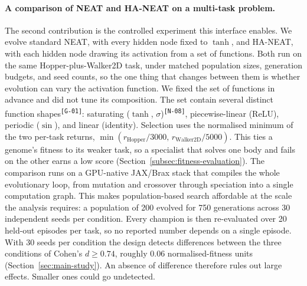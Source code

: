 \documentclass[12pt]{article}
\newcommand{\revID}[1]{\textsuperscript{\scriptsize\texttt{[#1]}}}
\newcommand{\revGram}[2]{\textcolor{lrRed}{#2}\revID{#1}}       %
\newcommand{\revNota}[2]{\textcolor{lrViolet}{#2}\revID{#1}}    %
\begin{document}
\paragraph{A comparison of NEAT and HA-NEAT on a multi-task problem.}
The second contribution is the controlled experiment this interface enables.
We evolve standard NEAT, with every hidden node fixed to $\tanh$, and HA-NEAT, with each hidden node drawing its activation from a set of functions.
Both run on the same Hopper-plus-Walker2D task, under matched population sizes, generation budgets, and seed counts, so the one thing that changes between them is whether evolution can vary the activation function.
We fixed the set of functions in advance and did not tune its composition.
\revGram{G-01}{The set contain several distinct function shapes}: \revNota{N-08}{saturating ($\tanh$, $\sigma$)}, piecewise-linear (ReLU), periodic ($\sin$), and linear (identity).
Selection uses the normalised minimum of the two per-task returns, $\min(r_{\text{Hopper}}/3000,\, r_{\text{Walker2D}}/5000)$.
This ties a genome's fitness to its weaker task, so a specialist that solves one body and fails on the other earns a low score (Section~\ref{subsec:fitness-evaluation}).
The comparison runs on a GPU-native JAX/Brax stack \parencite{freeman_brax_2021,wang_tensorized_2024} that compiles the whole evolutionary loop, from mutation and crossover through speciation into a single computation graph.
This makes population-based search affordable at the scale the analysis requires: a population of 200 evolved for 750 generations across 30 independent seeds per condition.
Every champion is then re-evaluated over 20 held-out episodes per task, so no reported number depends on a single episode.
With 30 seeds per condition the design detects differences between the three conditions of Cohen's $d \geq 0.74$, roughly 0.06 normalised-fitness units (Section~\ref{sec:main-study}). An absence of difference therefore rules out large effects. Smaller ones could go undetected.
\end{document}
